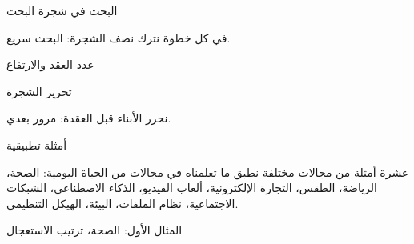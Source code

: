 \documentclass[aspectratio=169, 11pt, t, xcolor={table}]{beamer}
\begin{document}
\begin{frame}{البحث في شجرة البحث}
    \begin{center}
    \begin{minipage}{0.72\textwidth}
    \end{minipage}
    \end{center}
    \vspace{0.3cm}
    في كل خطوة نترك نصف الشجرة: البحث سريع.
\end{frame}

\begin{frame}{عدد العقد والارتفاع}
    \begin{center}
    \begin{minipage}{0.72\textwidth}
    \end{minipage}
    \end{center}
\end{frame}

\begin{frame}{تحرير الشجرة}
    \begin{center}
    \begin{minipage}{0.72\textwidth}
    \end{minipage}
    \end{center}
    \vspace{0.3cm}
    نحرر الأبناء قبل العقدة: مرور بعدي.
\end{frame}

\begin{frame}{أمثلة تطبيقية}
    \begin{tbox}{\faLaptopCode\quad عشرة أمثلة من مجالات مختلفة}
        نطبق ما تعلمناه في مجالات من الحياة اليومية:
        الصحة، الرياضة، الطقس، التجارة الإلكترونية، ألعاب الفيديو، الذكاء الاصطناعي، الشبكات الاجتماعية، نظام الملفات، البيئة، الهيكل التنظيمي.
    \end{tbox}
\end{frame}

\begin{frame}[t]{المثال الأول: الصحة، ترتيب الاستعجال}
    \begin{columns}[T]
    \end{columns}
\end{frame}
\end{document}
